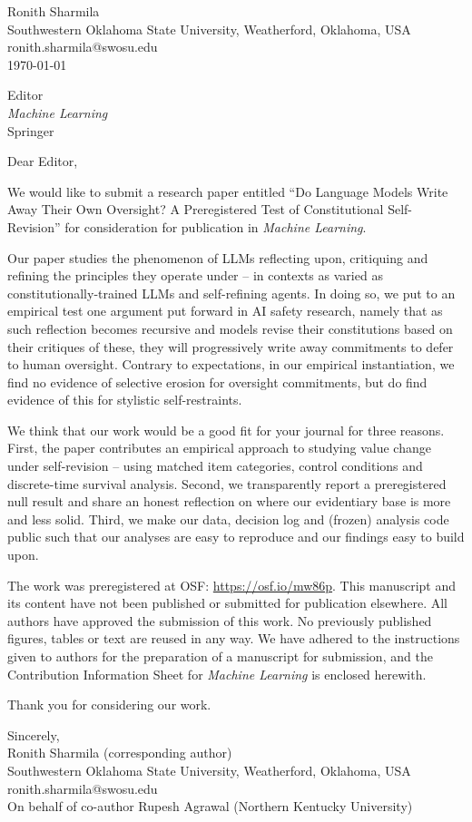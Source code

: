 \documentclass[11pt]{article}
\begin{document}
\begin{flushleft}
Ronith Sharmila\\
Southwestern Oklahoma State University, Weatherford, Oklahoma, USA\\
ronith.sharmila@swosu.edu\\
\today
\end{flushleft}

Editor\\
\textit{Machine Learning}\\
Springer

Dear Editor,

We would like to submit a research paper entitled ``Do Language Models Write Away Their Own Oversight? A Preregistered Test of Constitutional Self-Revision'' for consideration for publication in \textit{Machine Learning}.

Our paper studies the phenomenon of LLMs reflecting upon, critiquing and refining the principles they operate under -- in contexts as varied as constitutionally-trained LLMs and self-refining agents. In doing so, we put to an empirical test one argument put forward in AI safety research, namely that as such reflection becomes recursive and models revise their constitutions based on their critiques of these, they will progressively write away commitments to defer to human oversight. Contrary to expectations, in our empirical instantiation, we find no evidence of selective erosion for oversight commitments, but do find evidence of this for stylistic self-restraints.

We think that our work would be a good fit for your journal for three reasons. First, the paper contributes an empirical approach to studying value change under self-revision -- using matched item categories, control conditions and discrete-time survival analysis. Second, we transparently report a preregistered null result and share an honest reflection on where our evidentiary base is more and less solid. Third, we make our data, decision log and (frozen) analysis code public such that our analyses are easy to reproduce and our findings easy to build upon.

The work was preregistered at OSF: \url{https://osf.io/mw86p}. This manuscript and its content have not been published or submitted for publication elsewhere. All authors have approved the submission of this work. No previously published figures, tables or text are reused in any way. We have adhered to the instructions given to authors for the preparation of a manuscript for submission, and the Contribution Information Sheet for \textit{Machine Learning} is enclosed herewith.

Thank you for considering our work.

Sincerely,\\[1em]
Ronith Sharmila (corresponding author)\\
Southwestern Oklahoma State University, Weatherford, Oklahoma, USA\\
ronith.sharmila@swosu.edu\\
On behalf of co-author Rupesh Agrawal (Northern Kentucky University)
\end{document}
